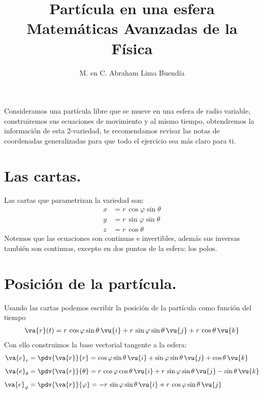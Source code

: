 
\title{Partícula en una esfera\\ \large{Matemáticas Avanzadas de la Física}\vspace{-3ex}}
\author{M. en C. Abraham Lima Buendía}
\date{ }

\vspace{-4cm}
\maketitle
\fontsize{14}{14}\selectfont
Consideramos una partícula libre que se mueve en una esfera de radio variable, construiremos sus ecuaciones de movimiento y al mismo tiempo, obtendremos la información de esta 2-variedad, te recomendamos revisar las notas de coordenadas generalizadas para que todo el ejercicio sea más claro para ti.
\section{Las cartas.}
Las cartas que parametrizan la variedad son:
\begin{align*}
x &= r \, \cos \varphi \sin \theta \\
y &= r \, \sin \varphi \sin \theta \\
z &= r \, \cos \theta
\end{align*}
Notemos que las ecuaciones son continuas e invertibles, además sus inversas también son continuas, excepto en dos puntos de la esfera: los polos.
\section{Posición de la partícula.}
Usando las cartas podemos escribir la posición de la partícula como función del tiempo
\begin{align*}
\va{r} (t) = r \, \cos \varphi \sin \theta \, \vu{i} + r \, \sin \varphi \sin \theta \, \vu{j} + r \, \cos \theta \, \vu{k}
\end{align*}
Con ello construimos la base vectorial tangente a la esfera:
\begin{align*}
\va{e}_{r} &= \pdv{\va{r}}{r} = \cos \varphi \sin \theta \, \vu{i} + \sin \varphi \sin \theta \, \vu{j} + \cos \theta \, \vu{k} \\[0.5em]
\va{e}_{\theta} &= \pdv{\va{r}}{\theta} = r\, \cos \varphi \cos \theta \, \vu{i} + r \, \sin \varphi \sin \theta \, \vu{j} - \sin \theta \, \vu{k} \\[0.5em]
\va{e}_{\varphi} &= \pdv{\va{r}}{\varphi} = - r \, \sin \varphi \sin \theta \, \vu{i} + r \, \cos \varphi \sin \theta \, \vu{j}
\end{align*}
